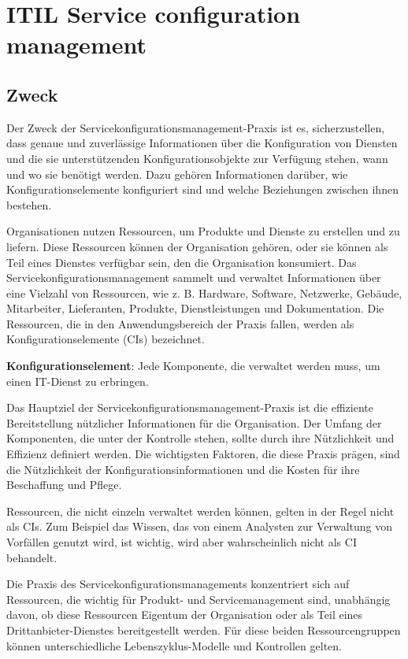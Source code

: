 \section{ITIL Service configuration management}

\subsection{Zweck}
Der Zweck der Servicekonfigurationsmanagement-Praxis ist es, sicherzustellen,
dass genaue und zuverlässige Informationen über die Konfiguration von
Diensten und die sie unterstützenden Konfigurationsobjekte zur Verfügung
stehen, wann und wo sie benötigt werden. Dazu gehören Informationen darüber,
wie Konfigurationselemente konfiguriert sind und welche
Beziehungen zwischen ihnen bestehen. 

Organisationen nutzen Ressourcen, um
Produkte und Dienste zu erstellen und zu liefern. Diese Ressourcen können der
Organisation gehören, oder sie können als Teil eines Dienstes verfügbar
sein, den die Organisation konsumiert. Das Servicekonfigurationsmanagement
sammelt und verwaltet Informationen über eine Vielzahl von Ressourcen, wie 
z. B. Hardware, Software, Netzwerke, Gebäude, Mitarbeiter, Lieferanten, Produkte,
Dienstleistungen und Dokumentation. Die Ressourcen, die in den
Anwendungsbereich der Praxis fallen, werden als Konfigurationselemente (CIs)
bezeichnet.

\begin{center}
	\textbf{Konfigurationselement}:
	Jede Komponente, die verwaltet werden muss, um einen IT-Dienst zu erbringen.
\end{center}

\noindent
Das Hauptziel der Servicekonfigurationsmanagement-Praxis ist die effiziente
Bereitstellung nützlicher Informationen für die Organisation.
Der Umfang der Komponenten, die unter der Kontrolle stehen, sollte durch
ihre Nützlichkeit und Effizienz definiert werden. Die wichtigsten Faktoren,
die diese Praxis prägen, sind die Nützlichkeit der
Konfigurationsinformationen und die Kosten für ihre Beschaffung und Pflege.

Ressourcen, die nicht einzeln verwaltet werden können, gelten in der Regel
nicht als CIs. Zum Beispiel das Wissen, das von einem Analysten zur Verwaltung
von Vorfällen genutzt wird, ist wichtig, wird aber wahrscheinlich nicht als CI
behandelt. 

Die Praxis des
Servicekonfigurationsmanagements konzentriert sich auf Ressourcen, die wichtig
für Produkt- und Servicemanagement sind, unabhängig davon, ob
diese Ressourcen Eigentum der Organisation oder als Teil 
eines Drittanbieter-Dienstes bereitgestellt werden. Für
diese beiden Ressourcengruppen können unterschiedliche Lebenszyklus-Modelle und
Kontrollen gelten.

